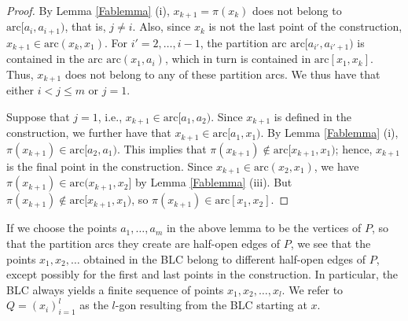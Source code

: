\documentclass[11pt]{amsart}
\theoremstyle{remark}
\numberwithin{equation}{section}
\newcommand{\arc}{\mathrm{arc}}
\renewcommand{\leq}{\leqslant}
\begin{document}
\begin{proof} 
By Lemma \ref{Fablemma} (i), $x_{k+1}=\pi(x_k)$ does not belong to $\arc[a_i,a_{i+1})$, that is, $j\neq i$. Also, since $x_k$ is not the last point of the construction,  $x_{k+1}\in \arc(x_k,x_1)$. For $i'=2,\ldots,i-1$, the partition arc $\arc[a_{i'},a_{i'+1})$ is contained in the arc $\arc(x_1,a_i)$, which in turn is contained in  $\arc[x_1,x_k]$. Thus, $x_{k+1}$ does not belong to any of these partition arcs. We thus have that either $i<j\leq m$ or $j=1$. 

Suppose that $j=1$, i.e., $x_{k+1}\in \arc[a_1,a_2)$. Since $x_{k+1}$ is defined in the construction, we further have that $x_{k+1}\in \arc[a_1,x_1)$. By Lemma \ref{Fablemma} (i), $\pi(x_{k+1})\in \arc[a_2,a_1)$. This implies that  $\pi(x_{k+1})\notin \arc[x_{k+1},x_1)$; hence, $x_{k+1}$ is the final point in the construction. Since $x_{k+1}\in \arc(x_2,x_1)$, we have $\pi(x_{k+1})\in \arc(x_{k+1},x_2]$ by Lemma \ref{Fablemma} (iii). But $\pi(x_{k+1})\notin \arc[x_{k+1},x_1)$, so $\pi(x_{k+1})\in \arc[x_1,x_2]$.
\end{proof}


If we choose the points $a_1,\ldots,a_m$ in the above lemma to be the vertices of $P$, so that the partition arcs they create  are half-open edges of $P$, we see that the points  $x_1,x_2,\ldots$ obtained in the BLC  belong to different half-open edges of $P$, except possibly for the first and last points in the construction. In particular, the  BLC always yields a finite sequence of points $x_1,x_2,\ldots,x_l$.  We refer to $Q=(x_i)_{i=1}^l$ as the $l$-gon resulting from the BLC starting at $x$. 
\end{document}
